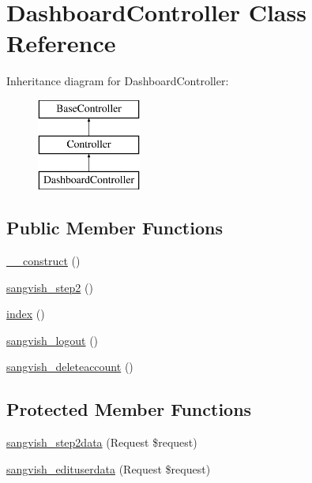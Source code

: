 \hypertarget{class_responsive_1_1_http_1_1_controllers_1_1_dashboard_controller}{}\section{Dashboard\+Controller Class Reference}
\label{class_responsive_1_1_http_1_1_controllers_1_1_dashboard_controller}
Inheritance diagram for Dashboard\+Controller\+:\begin{figure}[H]
\begin{center}
\leavevmode
\includegraphics[height=3.000000cm]{class_responsive_1_1_http_1_1_controllers_1_1_dashboard_controller}
\end{center}
\end{figure}
\subsection*{Public Member Functions}
\begin{DoxyCompactItemize}
\item 
\mbox{\hyperlink{class_responsive_1_1_http_1_1_controllers_1_1_dashboard_controller_a095c5d389db211932136b53f25f39685}{\+\_\+\+\_\+construct}} ()
\item 
\mbox{\hyperlink{class_responsive_1_1_http_1_1_controllers_1_1_dashboard_controller_a1fb1d3f3ee65c2682c3bcd488fe8b6f1}{sangvish\+\_\+step2}} ()
\item 
\mbox{\hyperlink{class_responsive_1_1_http_1_1_controllers_1_1_dashboard_controller_a149eb92716c1084a935e04a8d95f7347}{index}} ()
\item 
\mbox{\hyperlink{class_responsive_1_1_http_1_1_controllers_1_1_dashboard_controller_a595f19b3a13db3cd17f59c0be5eb62dc}{sangvish\+\_\+logout}} ()
\item 
\mbox{\hyperlink{class_responsive_1_1_http_1_1_controllers_1_1_dashboard_controller_ac7732bdb12c0cc27337589afaf3d720d}{sangvish\+\_\+deleteaccount}} ()
\end{DoxyCompactItemize}
\subsection*{Protected Member Functions}
\begin{DoxyCompactItemize}
\item 
\mbox{\hyperlink{class_responsive_1_1_http_1_1_controllers_1_1_dashboard_controller_a957f66d97649f43f487932b53859d3fd}{sangvish\+\_\+step2data}} (Request \$request)
\item 
\mbox{\hyperlink{class_responsive_1_1_http_1_1_controllers_1_1_dashboard_controller_ac1929cd853e7b182acb018e445708082}{sangvish\+\_\+edituserdata}} (Request \$request)
\end{DoxyCompactItemize}



